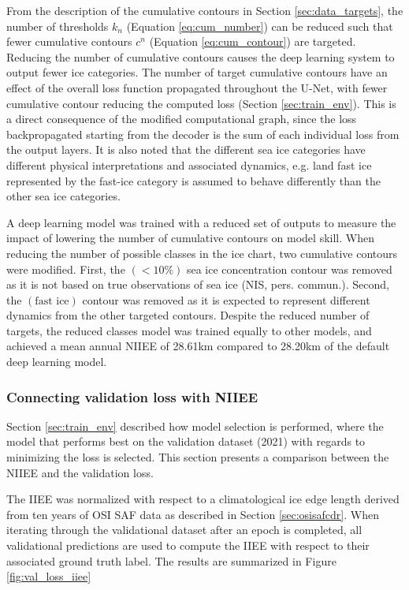 \documentclass[../main/thesis]{subfiles}
\begin{document}
From the description of the cumulative contours in Section \ref{sec:data_targets}, the number of thresholds $k_n$ (Equation \ref{eq:cum_number}) can be reduced such that fewer cumulative contours $c^n$ (Equation \ref{eq:cum_contour}) are targeted. Reducing the number of cumulative contours causes the deep learning system to output fewer ice categories. The number of target cumulative contours have an effect of the overall loss function propagated throughout the U-Net, with fewer cumulative contour reducing the computed loss (Section \ref{sec:train_env}). This is a direct consequence of the modified computational graph, since the loss backpropagated starting from the decoder is the sum of each individual loss from the output layers. It is also noted that the different sea ice categories have different physical interpretations and associated dynamics, e.g. land fast ice represented by the fast-ice category is assumed to behave differently than the other sea ice categories.

A deep learning model was trained with a reduced set of outputs to measure the impact of lowering the number of cumulative contours on model skill. When reducing the number of possible classes in the ice chart, two cumulative contours were modified. First, the $(< 10\%)$ sea ice concentration contour was removed as it is not based on true observations of sea ice (NIS, pers. commun.). Second, the $(\text{fast ice})$ contour was removed as it is expected to represent different dynamics from the other targeted contours. Despite the reduced number of targets, the reduced classes model was trained equally to other models, and achieved a mean annual NIIEE of 28.61km compared to 28.20km of the default deep learning model.

\subsubsection{Connecting validation loss with NIIEE}
\label{sec:connecting_val_loss_with_NIIEE}
Section \ref{sec:train_env} described how model selection is performed, where the model that performs best on the validation dataset (2021) with regards to minimizing the loss is selected. This section presents a comparison between the NIIEE and the validation loss.

The IIEE was normalized with respect to a climatological ice edge length derived from ten years of OSI SAF data as described in Section \ref{sec:osisafcdr}. When iterating through the validational dataset after an epoch is completed, all validational predictions are used to compute the IIEE with respect to their associated ground truth label. The results are summarized in Figure \ref{fig:val_loss_iiee}
\end{document}
